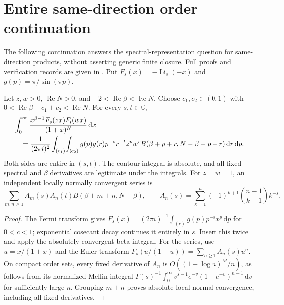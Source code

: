 \section{Entire same-direction order continuation}
\label{sdco:sec:continuation}
The following continuation answers the spectral-representation question for
same-direction products, without asserting generic finite closure. Full
proofs and verification records are given in \cite{SDCO2026}. Put
$F_s(x)=-\operatorname{Li}_s(-x)$ and $g(p)=\pi/\sin(\pi p)$.

\begin{theorem}
\label{sdco:thm:master}
Let $z,w>0$, $\operatorname{Re}N>0$, and
$-2<\operatorname{Re}\beta<\operatorname{Re}N$. Choose $c_1,c_2\in(0,1)$ with
$0<\operatorname{Re}\beta+c_1+c_2<\operatorname{Re}N$.
For every $s,t\in\mathbb C$,
\begin{align}
 &\int_0^\infty\frac{x^{\beta-1}F_s(zx)F_t(wx)}{(1+x)^N}\,\mathrm dx
 \label{sdco:eq:master}\\
 &\quad=\frac1{(2\pi i)^2}\int_{(c_1)}\!\int_{(c_2)}
 g(p)g(r)p^{-s}r^{-t}z^pw^r
 B(\beta+p+r,N-\beta-p-r)\,\mathrm dr\,\mathrm dp.\notag
\end{align}
Both sides are entire in $(s,t)$. The contour integral is absolute, and all
fixed spectral and $\beta$ derivatives are legitimate under the integrals.
For $z=w=1$, an independent locally normally convergent series is
\begin{equation}\label{sdco:eq:Newton}
 \sum_{m,n\ge1}A_m(s)A_n(t)B(\beta+m+n,N-\beta),\qquad
 A_n(s)=\sum_{k=1}^n(-1)^{k+1}\binom{n-1}{k-1}k^{-s}.
\end{equation}
\end{theorem}
\begin{proof}
The Fermi transform gives
$F_s(x)=(2\pi i)^{-1}\int_{(c)}g(p)p^{-s}x^p\,\mathrm dp$ for $0<c<1$;
exponential cosecant decay continues it entirely in $s$. Insert this twice
and apply the absolutely convergent beta integral. For the series, use
$u=x/(1+x)$ and the Euler transform
$F_s(u/(1-u))=\sum_{n\ge1}A_n(s)u^n$.
On compact order sets, every fixed derivative of $A_n$ is
$O((1+\log n)^M/n)$, as follows from its normalized Mellin integral
$\Gamma(s)^{-1}\int_0^\infty v^{s-1}e^{-v}(1-e^{-v})^{n-1}\,\mathrm dv$
for sufficiently large $n$. Grouping $m+n$ proves absolute local normal
convergence, including all fixed derivatives.
\end{proof}

